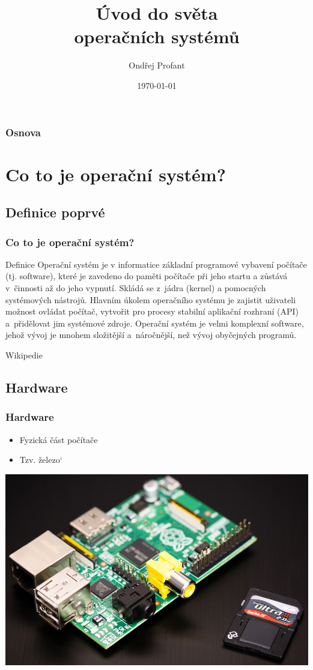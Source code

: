 \documentclass[xetex]{beamer}
\title{Úvod do světa\\ operačních systémů}
\author{Ondřej Profant}
\institute[Piráti]{Knihovna Průhonice\\ Česká pirátská strana}
\date{\today}
\begin{document}
\begin{frame}
  \titlepage
\end{frame}

\begin{frame}
  \frametitle{Osnova}
  \tableofcontents
\end{frame}	

\section{Co to je operační systém?}

\subsection{Definice poprvé}
\begin{frame}
 \frametitle{Co to je operační systém?} 
\begin{block}{Definice}
Operační systém je v informatice základní programové vybavení počítače (tj. software), které je zavedeno do paměti počítače při jeho startu a zůstává v~činnosti až do jeho vypnutí. Skládá se z~jádra (kernel) a pomocných systémových nástrojů. Hlavním úkolem operačního systému je zajistit uživateli možnost ovládat počítač, vytvořit pro procesy stabilní aplikační rozhraní (API) a~přidělovat jim systémové zdroje. Operační systém je velmi komplexní software, jehož vývoj je mnohem složitější a~náročnější, než vývoj obyčejných programů.
\end{block}
 \begin{flushright}
  Wikipedie
 \end{flushright}
\end{frame}

\subsection{Hardware}
\begin{frame}
 \frametitle{Hardware}
  \begin{itemize}
  \item Fyzická část počítače
  \item Tzv. železo`
 \end{itemize}
 \includegraphics[scale=0.25]{pic/hw.png}
\end{frame}
\end{document}
